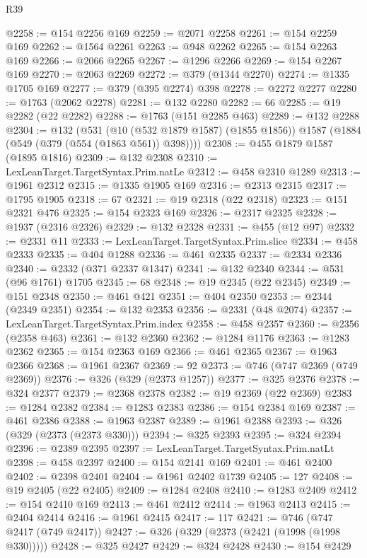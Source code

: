 \begin{lexlean}{R39}
\begin{coremodule}
@2258 := @154 @2256 @169
@2259 := @2071 @2258
@2261 := @154 @2259 @169
@2262 := @1564 @2261
@2263 := @948 @2262
@2265 := @154 @2263 @169
@2266 := @2066 @2265
@2267 := @1296 @2266
@2269 := @154 @2267 @169
@2270 := @2063 @2269
@2272 := @379 (@1344 @2270)
@2274 := @1335 @1705 @169
@2277 := @379 (@395 @2274) @398
@2278 := @2272 @2277
@2280 := @1763 (@2062 @2278)
@2281 := @132 @2280
@2282 := 66
@2285 := @19 @2282 (@22 @2282)
@2288 := @1763 (@151 @2285 @463)
@2289 := @132 @2288
@2304 := @132
    (@531
      (@10 (@532 @1879 @1587) (@1855 @1856))
      @1587
      (@1884 (@549 (@379 (@554 (@1863 @561)) @398))))
@2308 := @455 @1879 @1587 (@1895 @1816)
@2309 := @132 @2308
@2310 := LexLeanTarget.TargetSyntax.Prim.natLe
@2312 := @458 @2310 @1289
@2313 := @1961 @2312
@2315 := @1335 @1905 @169
@2316 := @2313 @2315
@2317 := @1795 @1905
@2318 := 67
@2321 := @19 @2318 (@22 @2318)
@2323 := @151 @2321 @476
@2325 := @154 @2323 @169
@2326 := @2317 @2325
@2328 := @1937 (@2316 @2326)
@2329 := @132 @2328
@2331 := @455 (@12 @97)
@2332 := @2331 @11
@2333 := LexLeanTarget.TargetSyntax.Prim.slice
@2334 := @458 @2333
@2335 := @404 @1288
@2336 := @461 @2335
@2337 := @2334 @2336
@2340 := @2332 (@371 @2337 @1347)
@2341 := @132 @2340
@2344 := @531 (@96 @1761) @1705
@2345 := 68
@2348 := @19 @2345 (@22 @2345)
@2349 := @151 @2348
@2350 := @461 @421
@2351 := @404 @2350
@2353 := @2344 (@2349 @2351)
@2354 := @132 @2353
@2356 := @2331 (@48 @2074)
@2357 := LexLeanTarget.TargetSyntax.Prim.index
@2358 := @458 @2357
@2360 := @2356 (@2358 @463)
@2361 := @132 @2360
@2362 := @1284 @1176
@2363 := @1283 @2362
@2365 := @154 @2363 @169
@2366 := @461 @2365
@2367 := @1963 @2366
@2368 := @1961 @2367
@2369 := 92
@2373 := @746 (@747 @2369 (@749 @2369))
@2376 := @326 (@329 (@2373 @1257))
@2377 := @325 @2376
@2378 := @324 @2377
@2379 := @2368 @2378
@2382 := @19 @2369 (@22 @2369)
@2383 := @1284 @2382
@2384 := @1283 @2383
@2386 := @154 @2384 @169
@2387 := @461 @2386
@2388 := @1963 @2387
@2389 := @1961 @2388
@2393 := @326 (@329 (@2373 (@2373 @330)))
@2394 := @325 @2393
@2395 := @324 @2394
@2396 := @2389 @2395
@2397 := LexLeanTarget.TargetSyntax.Prim.natLt
@2398 := @458 @2397
@2400 := @154 @2141 @169
@2401 := @461 @2400
@2402 := @2398 @2401
@2404 := @1961 @2402 @1739
@2405 := 127
@2408 := @19 @2405 (@22 @2405)
@2409 := @1284 @2408
@2410 := @1283 @2409
@2412 := @154 @2410 @169
@2413 := @461 @2412
@2414 := @1963 @2413
@2415 := @2404 @2414
@2416 := @1961 @2415
@2417 := 117
@2421 := @746 (@747 @2417 (@749 @2417))
@2427 := @326 (@329 (@2373 (@2421 (@1998 (@1998 @330)))))
@2428 := @325 @2427
@2429 := @324 @2428
@2430 := @154 @2429

\end{coremodule}
\end{lexlean}
